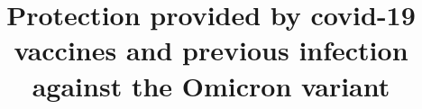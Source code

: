 \documentclass[preprint,12pt,authoryear]{elsarticle}
\begin{document}
\begin{frontmatter}



\title{Protection provided by covid-19 vaccines and previous infection against the Omicron variant}


\author{}



\end{frontmatter}
\end{document}
